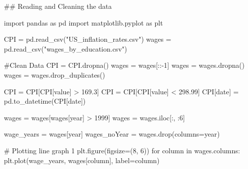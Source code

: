 \documentclass[
  letterpaper,
  DIV=11,
  numbers=noendperiod]{scrartcl}
\newenvironment{Shaded}{\begin{snugshade}}{\end{snugshade}}
\newcommand{\CommentTok}[1]{\textcolor[rgb]{0.37,0.37,0.37}{#1}}
\newcommand{\ControlFlowTok}[1]{\textcolor[rgb]{0.00,0.23,0.31}{#1}}
\newcommand{\DecValTok}[1]{\textcolor[rgb]{0.68,0.00,0.00}{#1}}
\newcommand{\FloatTok}[1]{\textcolor[rgb]{0.68,0.00,0.00}{#1}}
\newcommand{\ImportTok}[1]{\textcolor[rgb]{0.00,0.46,0.62}{#1}}
\newcommand{\KeywordTok}[1]{\textcolor[rgb]{0.00,0.23,0.31}{#1}}
\newcommand{\NormalTok}[1]{\textcolor[rgb]{0.00,0.23,0.31}{#1}}
\newcommand{\OperatorTok}[1]{\textcolor[rgb]{0.37,0.37,0.37}{#1}}
\newcommand{\StringTok}[1]{\textcolor[rgb]{0.13,0.47,0.30}{#1}}
\begin{document}
\begin{Shaded}
\begin{Highlighting}[]
\CommentTok{\#\# Reading and Cleaning the data}

\ImportTok{import}\NormalTok{ pandas }\ImportTok{as}\NormalTok{ pd}
\ImportTok{import}\NormalTok{ matplotlib.pyplot }\ImportTok{as}\NormalTok{ plt}


\NormalTok{CPI }\OperatorTok{=}\NormalTok{ pd.read\_csv(}\StringTok{"US\_inflation\_rates.csv"}\NormalTok{)}
\NormalTok{wages }\OperatorTok{=}\NormalTok{ pd.read\_csv(}\StringTok{"wages\_by\_education.csv"}\NormalTok{)}

\CommentTok{\#Clean Data}
\NormalTok{CPI }\OperatorTok{=}\NormalTok{ CPI.dropna()}
\NormalTok{wages }\OperatorTok{=}\NormalTok{ wages[::}\OperatorTok{{-}}\DecValTok{1}\NormalTok{]}
\NormalTok{wages }\OperatorTok{=}\NormalTok{ wages.dropna()}
\NormalTok{wages }\OperatorTok{=}\NormalTok{ wages.drop\_duplicates()}

\NormalTok{CPI }\OperatorTok{=}\NormalTok{ CPI[CPI[}\StringTok{\textquotesingle{}value\textquotesingle{}}\NormalTok{] }\OperatorTok{\textgreater{}} \FloatTok{169.3}\NormalTok{]}
\NormalTok{CPI }\OperatorTok{=}\NormalTok{ CPI[CPI[}\StringTok{\textquotesingle{}value\textquotesingle{}}\NormalTok{] }\OperatorTok{\textless{}} \FloatTok{298.99}\NormalTok{]}
\NormalTok{CPI[}\StringTok{\textquotesingle{}date\textquotesingle{}}\NormalTok{] }\OperatorTok{=}\NormalTok{ pd.to\_datetime(CPI[}\StringTok{\textquotesingle{}date\textquotesingle{}}\NormalTok{])}

\NormalTok{wages }\OperatorTok{=}\NormalTok{ wages[wages[}\StringTok{\textquotesingle{}year\textquotesingle{}}\NormalTok{] }\OperatorTok{\textgreater{}} \DecValTok{1999}\NormalTok{]}
\NormalTok{wages }\OperatorTok{=}\NormalTok{ wages.iloc[:, :}\DecValTok{6}\NormalTok{]}


\NormalTok{wage\_years }\OperatorTok{=}\NormalTok{ wages[}\StringTok{\textquotesingle{}year\textquotesingle{}}\NormalTok{]}
\NormalTok{wages\_noYear }\OperatorTok{=}\NormalTok{ wages.drop(columns}\OperatorTok{=}\StringTok{\textquotesingle{}year\textquotesingle{}}\NormalTok{) }


\CommentTok{\# Plotting line graph 1}
\NormalTok{plt.figure(figsize}\OperatorTok{=}\NormalTok{(}\DecValTok{8}\NormalTok{, }\DecValTok{6}\NormalTok{))}
\ControlFlowTok{for}\NormalTok{ column }\KeywordTok{in}\NormalTok{ wages.columns:}
\NormalTok{    plt.plot(wage\_years, wages[column], label}\OperatorTok{=}\NormalTok{column)}


\end{Highlighting}
\end{Shaded}
\end{document}
